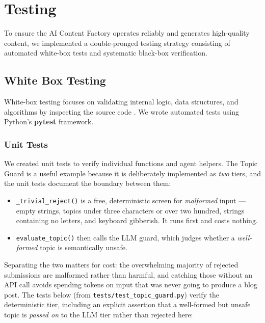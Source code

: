 \section{Testing}

To ensure the AI Content Factory operates reliably and generates high-quality content, we implemented a double-pronged testing strategy consisting of automated white-box tests and systematic black-box verification.

\subsection{White Box Testing}
White-box testing focuses on validating internal logic, data structures, and algorithms by inspecting the source code \cite{fowler_unit_test}. We wrote automated tests using Python's \textbf{pytest} framework.

\subsubsection{Unit Tests}
We created unit tests to verify individual functions and agent helpers. The
Topic Guard is a useful example because it is deliberately implemented as
\emph{two} tiers, and the unit tests document the boundary between them:

\begin{itemize}
    \item \texttt{\_trivial\_reject()} is a free, deterministic screen for
      \emph{malformed} input --- empty strings, topics under three characters
      or over two hundred, strings containing no letters, and keyboard
      gibberish. It runs first and costs nothing.
    \item \texttt{evaluate\_topic()} then calls the LLM guard, which judges
      whether a \emph{well-formed} topic is semantically unsafe.
\end{itemize}

Separating the two matters for cost: the overwhelming majority of rejected
submissions are malformed rather than harmful, and catching those without an
API call avoids spending tokens on input that was never going to produce a
blog post. The tests below (from \texttt{tests/test\_topic\_guard.py}) verify
the deterministic tier, including an explicit assertion that a well-formed but
unsafe topic is \emph{passed on} to the LLM tier rather than rejected here:

